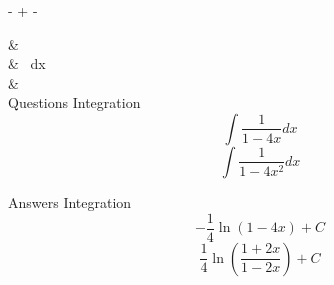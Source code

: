 
 -  + - 


& \\ 


& \ dx\\ 

&\\ 


Questions Integration
\[\int {\frac{1}{{1 - 4x}}dx} \]
\[\int {\frac{1}{{1 - 4{x^2}}}dx}\]

Answers Integration 
\[- \frac{1}{4}\ln \left( {1 - 4x} \right) + C\]
\[\frac{1}{4}\ln \left( {\frac{{1 + 2x}}{{1 - 2x}}} \right) + C\]
